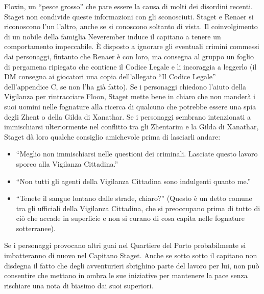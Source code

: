 \documentclass{article}
\begin{document}
Floxin, un “pesce grosso” che pare essere la causa di
molti dei disordini recenti. Staget non condivide queste
informazioni con gli sconosciuti.
Staget e Renaer si riconoscono l’un l’altro, anche se si
conoscono soltanto di vista. Il coinvolgimento di un nobile
della famiglia Neverember induce il capitano a tenere
un comportamento impeccabile. È disposto a ignorare
gli eventuali crimini commessi dai personaggi, fintanto
che Renaer è con loro, ma consegna al gruppo un foglio
di pergamena ripiegato che contiene il Codice Legale e
li incoraggia a leggerlo (il DM consegna ai giocatori una
copia dell'allegato “Il Codice Legale” dell’appendice C, se
non l’ha già fatto).
Se i personaggi chiedono l'aiuto della Vigilanza per
rintracciare Floon, Staget mette bene in chiaro che non
manderà i suoi uomini nelle fognature alla ricerca di
qualcuno che potrebbe essere una spia degli Zhent o della
Gilda di Xanathar. Se i personaggi sembrano intenzionati a
immischiarsi ulteriormente nel conflitto tra gli Zhentarim
e la Gilda di Xanathar, Staget dà loro qualche consiglio
amichevole prima di lasciarli andare: 

\begin{itemize}
    \item “Meglio non immischiarsi nelle questioni dei criminali.
    Lasciate questo lavoro sporco alla Vigilanza Cittadina.”
    \item “Non tutti gli agenti della Vigilanza Cittadina sono
    indulgenti quanto me.”
    \item “Tenete il sangue lontano dalle strade, chiaro?” (Questo è
    un detto comune tra gli ufficiali della Vigilanza Cittadina,
    che si preoccupano prima di tutto di ciò che accade in
    superficie e non si curano di cosa capita nelle fognature
    sotterranee).
\end{itemize}

Se i personaggi provocano altri guai nel Quartiere del
Porto probabilmente si imbatteranno di nuovo nel Capitano
Staget. Anche se sotto sotto il capitano non disdegna il fatto
che degli avventurieri sbrighino parte del lavoro per lui,
non può consentire che mettano in ombra le sue iniziative
per mantenere la pace senza rischiare una nota di biasimo
dai suoi superiori.
 
\end{document}
